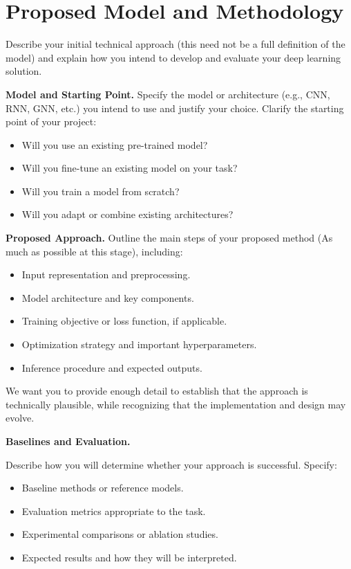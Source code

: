 \documentclass[11pt]{article}
\begin{document}
\section{Proposed Model and Methodology}

Describe your initial technical approach (this need not be a full definition of the model) and explain how you intend
to develop and evaluate your deep learning solution.

{\bf Model and Starting Point.} 
Specify the model or architecture (e.g., CNN, RNN, GNN, etc.) you intend to use and justify your choice. Clarify the starting point of your project:
\begin{itemize}[noitemsep]
    \item Will you use an existing pre-trained model?
    \item Will you fine-tune an existing model on your task?
    \item Will you train a model from scratch?
    \item Will you adapt or combine existing architectures?
\end{itemize}


{\bf Proposed Approach.}
Outline the main steps of your proposed method (As much as possible at this stage), including:
\begin{itemize} [noitemsep]
    \item Input representation and preprocessing.
    \item Model architecture and key components.
    \item Training objective or loss function, if applicable.
    \item Optimization strategy and important hyperparameters.
    \item Inference procedure and expected outputs.
\end{itemize}

We want you to provide enough detail to establish that the approach is technically plausible, while recognizing that the implementation and design may evolve.

{\bf Baselines and Evaluation.}

Describe how you will determine whether your approach is successful. Specify:
\begin{itemize}[noitemsep]
    \item Baseline methods or reference models.
    \item Evaluation metrics appropriate to the task.
    \item Experimental comparisons or ablation studies.
    \item Expected results and how they will be interpreted.
\end{itemize}
\end{document}
